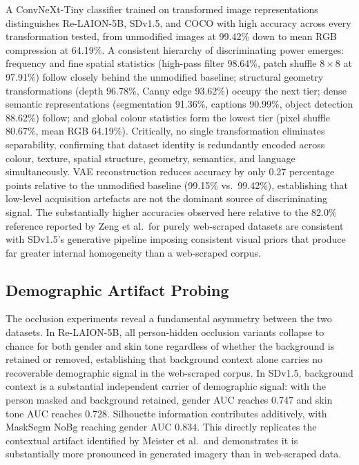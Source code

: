 A ConvNeXt-Tiny classifier trained on transformed image representations distinguishes
Re-LAION-5B, SDv1.5, and COCO with high accuracy across every transformation tested,
from unmodified images at 99.42\% down to mean RGB compression at 64.19\%. A
consistent hierarchy of discriminating power emerges: frequency and fine spatial
statistics (high-pass filter 98.64\%, patch shuffle $8{\times}8$ at 97.91\%) follow
closely behind the unmodified baseline; structural geometry transformations (depth
96.78\%, Canny edge 93.62\%) occupy the next tier; dense semantic representations
(segmentation 91.36\%, captions 90.99\%, object detection 88.62\%) follow; and global
colour statistics form the lowest tier (pixel shuffle 80.67\%, mean RGB 64.19\%).
Critically, no single transformation eliminates separability, confirming that dataset
identity is redundantly encoded across colour, texture, spatial structure, geometry,
semantics, and language simultaneously. VAE reconstruction reduces accuracy by only
0.27 percentage points relative to the unmodified baseline (99.15\% vs.\ 99.42\%),
establishing that low-level acquisition artefacts are not the dominant source of
discriminating signal. The substantially higher accuracies observed here relative to
the 82.0\% reference reported by Zeng et al.\ for purely web-scraped datasets are
consistent with SDv1.5's generative pipeline imposing consistent visual priors that
produce far greater internal homogeneity than a web-scraped corpus.

\subsection{Demographic Artifact Probing}

The occlusion experiments reveal a fundamental asymmetry between the two datasets.
In Re-LAION-5B, all person-hidden occlusion variants collapse to chance for both
gender and skin tone regardless of whether the background is retained or removed,
establishing that background context alone carries no recoverable demographic signal
in the web-scraped corpus. In SDv1.5, background context is a substantial independent
carrier of demographic signal: with the person masked and background retained, gender
AUC reaches 0.747 and skin tone AUC reaches 0.728. Silhouette information contributes
additively, with MaskSegm NoBg reaching gender AUC 0.834. This directly replicates the
contextual artifact identified by Meister et al.\ and demonstrates it is substantially
more pronounced in generated imagery than in web-scraped data.

